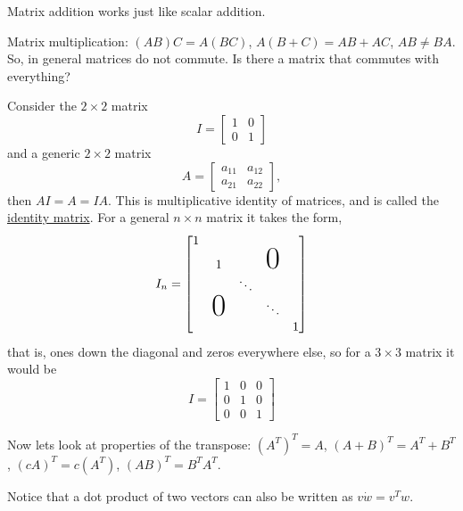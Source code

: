 \documentclass[reqno]{amsart}
\theoremstyle{definition}
\begin{document}
Matrix addition works just like scalar addition.

Matrix multiplication:  $(AB)C = A(BC)$, $A(B+C) = AB + AC$, $AB \neq BA$.
So, in general matrices do not commute.  Is there a matrix that commutes with everything?

Consider the $2 \times 2$ matrix
%
\begin{equation}
I = \begin{bmatrix}
1 & 0\\
0 & 1
\end{bmatrix}
\end{equation}
%
and a generic $2 \times 2$ matrix
%
\begin{equation*}
A = \begin{bmatrix}
a_{11} & a_{12}\\
a_{21} & a_{22}
\end{bmatrix},
\end{equation*}
%
then $AI = A = IA$.  This is multiplicative identity of matrices, and is called the \underline{identity matrix}.
For a general $n \times n$ matrix it takes the form,
%
\begin{equation}
I_n = \begin{bmatrix}
1 & & & & \\
   & 1 & & \bigzero & \\
 &  & \ddots & & \\
 & \bigzero   &  &  \ddots & \\
   &  &  &  & 1
\end{bmatrix}
\end{equation}
%
that is, ones down the diagonal and zeros everywhere else, so for a $3 \times 3$ matrix it would be
%
\begin{equation*}
I = \begin{bmatrix}
1 & 0 & 0\\
0 & 1 & 0\\
0 & 0 & 1
\end{bmatrix}
\end{equation*}

Now lets look at properties of the transpose:  $(A^T)^T = A$, $(A+B)^T = A^T + B^T$, $(cA)^T = c(A^T)$,
$(AB)^T = B^TA^T$.

Notice that a dot product of two vectors can also be written as $v \dot w = v^Tw$.
\end{document}
